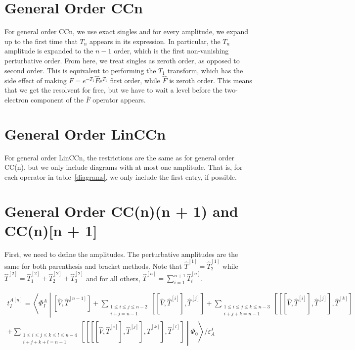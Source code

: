 \documentclass{article}
\begin{document}
\section{General Order CCn}

For general order CCn, we use exact singles and for every amplitude, we expand up to the first time that $T_n$ appears in its expression. In particular, the $T_n$ amplitude is expanded to the $n - 1$ order, which is the first non-vanishing perturbative order. From here, we treat singles as zeroth order, as opposed to second order. This is equivalent to performing the $T_1$ transform, which has the side effect of making $\overline{F} = e^{-\hat{T}_1}\hat{F}e^{\hat{T}_1}$ first order, while $\hat{F}$ is zeroth order. This means that we get the resolvent for free, but we have to wait a level before the two-electron component of the $\overline{F}$ operator appears.

\section{General Order LinCCn}

For general order LinCCn, the restrictions are the same as for general order CC(n), but we only include diagrams with at most one amplitude. That is, for each operator in table~\ref{diagrams}, we only include the first entry, if possible.

\section{General Order CC(n)(n + 1) and CC(n)[n + 1]}

First, we need to define the amplitudes. The perturbative amplitudes are the same for both parenthesis and bracket methods. Note that $\hat{T}^{\left[1\right]} = \hat{T}_2^{\left[1\right]}$ while $\hat{T}^{\left[2\right]} = \hat{T}_1^{\left[2\right]} + \hat{T}_2^{\left[2\right]} + \hat{T}_3^{\left[2\right]}$ and for all others, $\hat{T}^{\left[n\right]} = \sum_{i = 1}^{n + 1} \hat{T}^{\left[n\right]}_{i}$.

\begin{multline}
  t_{I}^{A[n]} = \left<\Phi_I^A\middle|\left[\hat{V}, \hat{T}^{[n - 1]}\right] + \sum_{\substack{1\le i\le j \le n - 2 \\ i + j = n - 1}}\left[\left[\hat{V}, \hat{T}^{\left[i\right]}\right], \hat{T}^{\left[j\right]}\right] + \sum_{\substack{1\le i\le j\le k \le n - 3 \\ i + j + k = n - 1}} \left[\left[\left[\hat{V}, \hat{T}^{\left[i\right]}\right], \hat{T}^{\left[j\right]}\right], \hat{T}^{\left[k\right]}\right] \right.\\
  \left.+ \sum_{\substack{1\le i \le j \le k \le l \le n - 4 \\ i + j + k + l = n - 1}}\left[\left[\left[\left[\hat{V}, \hat{T}^{\left[i\right]}\right], \hat{T}^{\left[j\right]}\right], \hat{T}^{\left[k\right]}\right], \hat{T}^{\left[l\right]}\right]\middle|\Phi_0\right>/\varepsilon_A^I
\end{multline}
\end{document}
